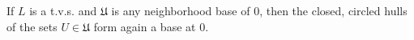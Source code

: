 If $L$ is a t.v.s. and $\mathfrak{U}$ is any neighborhood base of 0, then the closed, circled hulls of the sets $U \in \mathfrak{U}$ form again a base at 0.
